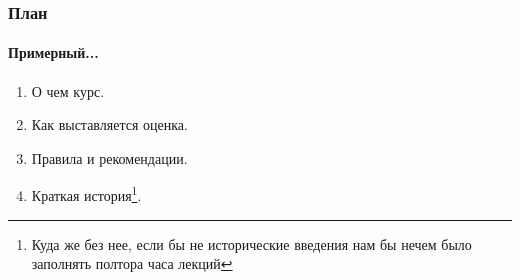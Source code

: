 \begin{frame}
\frametitle{План}
\framesubtitle{Примерный...}

\begin{enumerate}
  \item О чем курс.
  \item Как выставляется оценка.
  \item Правила и рекомендации.
  \item Краткая история\footnote{Куда же без нее, если бы не исторические
        введения нам бы нечем было заполнять полтора часа лекций}.
\end{enumerate}

\end{frame}
